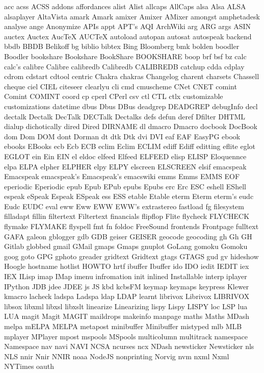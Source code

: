 acc
acss
ACSS
addons
affordances
alist
Alist
allcaps
AllCaps
alsa
Alsa
ALSA
alsaplayer
AltaVista
amark
Amark
amixer
Amixer
AMixer
amongst
amphetadesk
analyse
ange
Anonymize
APIs
appt
APT's
AQI
ArchWiki
arg
ARG
args
ASIN
auctex
Auctex
AucTeX
AUCTeX
autoload
autopan
autosat
autospeak
backend
bbdb
BBDB
Belikoff
bg
biblio
bibtex
Bing
Bloomberg
bmk
bolden
boodler
Boodler
bookshare
Bookshare
BookShare
BOOKSHARE
boop
brf
bsf
bz
calc
calc's
calibre
Calibre
calibredb
Calibredb
CALIBREDB
catchup
cdda
cdplay
cdrom
cdstart
cdtool
centric
Chakra
chakras
Changelog
charent
charsets
Chassell
cheque
ciel
CIEL
citeseer
clearlyu
cli
cmd
cmuscheme
CNet
CNET
comint
Comint
COMINT
coord
cp
cperl
CPerl
csv
ctl
CTL
ctlx
customizable
customizations
datetime
dbus
Dbus
DBus
deadgrep
DEADGREP
debugInfo
decl
dectalk
Dectalk
DecTalk
DECTalk
Dectalks
defs
defun
deref
Dfilter
DHTML
dialup
dichotically
dired
Dired
DIRNAME
dl
dmacro
Dmacro
docbook
DocBook
dom
Dom
DOM
dont
Dorman
dt
dtk
Dtk
dvi
DVI
eaf
EAF
EasyPG
ebook
ebooks
EBooks
ecb
Ecb
ECB
eclim
Eclim
ECLIM
ediff
Ediff
editting
eflite
eglot
EGLOT
ein
Ein
EIN
el
eldoc
elfeed
Elfeed
ELFEED
elisp
ELISP
Eloquennce
elpa
ELPA
elpher
ELPHER
elpy
ELPY
elscreen
ELSCREEN
elsif
emacspeak
Emacspeak
emacspeak's
Emacspeak's
emacswiki
emms
Emms
EMMS
EOF
eperiodic
Eperiodic
epub
Epub
EPub
epubs
Epubs
erc
Erc
ESC
eshell
EShell
espeak
eSpeak
Espeak
ESpeak
ess
ESS
etable
Etable
eterm
Eterm
eterm's
eudc
Eudc
EUDC
eval
eww
Eww
EWW
EWW's
extrastereo
fastload
fg
filesystem
filladapt
fillin
filtertext
Filtertext
financials
flipflop
Flite
flycheck
FLYCHECK
flymake
FLYMAKE
flyspell
fmt
fn
foldoc
FreeSound
frontends
Frontpage
fulltext
GAFA
galeon
gblogger
gdb
GDB
geiser
GEISER
geocode
geocoding
gh
Gh
GH
Gitlab
globbed
gmail
GMail
gmaps
Gmaps
gnuplot
GoLang
gomoku
Gomoku
goog
goto
GPG
gphoto
greader
gridtext
Gridtext
gtags
GTAGS
gud
gv
hideshow
Hoogle
hostname
hotlist
HOWTO
hrtf
ibuffer
Ibuffer
ido
IDO
iedit
IEDIT
iex
IEX
ILisp
imap
IMap
imenu
infromation
init
inlined
Installable
interp
iplayer
IPython
JDB
jdee
JDEE
js
JS
kbd
kcbsFM
keymap
keymaps
keypress
Klewer
kmacro
lacheck
ladspa
Ladspa
ldap
LDAP
learnt
librivox
Librivox
LIBRIVOX
libsox
libxml
libxsl
libxslt
linearize
Linearizing
lispy
Lispy
LISPY
loc
LSP
lua
LUA
magit
Magit
MAGIT
maildrops
makeinfo
manpage
maths
Maths
MDash
melpa
mELPA
MELPA
metapost
minibuffer
Minibuffer
mistyped
mlb
MLB
mplayer
MPlayer
mpost
mspools
MSpools
multicolumn
multitrack
namespace
Namespace
nav
navi
NAVI
NCSA
ncurses
ncx
NDash
newsticker
Newsticker
nls
NLS
nnir
Nnir
NNIR
noaa
NodeJS
nonprinting
Norvig
nvm
nxml
Nxml
NYTimes
oauth
